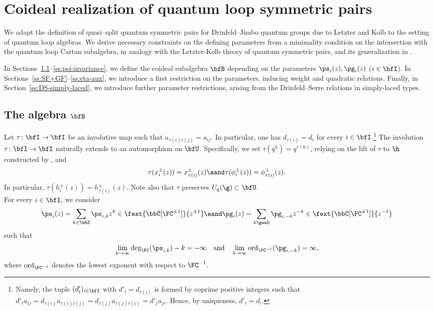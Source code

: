 \documentclass[reqno]{amsart}
\numberwithin{equation}{section}
\begin{document}
\section{Coideal realization of quantum loop symmetric pairs}\label{s:coideal-QLSP}

We adapt the definition of quasi--split quantum symmetric pairs for Drinfeld--Jimbo quantum groups due to Letzter and Kolb \cite{letzter-02,kolb-14} to the setting of quantum loop algebras. We derive necessary constraints on the defining parameters from a minimality condition on the intersection with the quantum loop Cartan subalgebra, in analogy with the Letzter-Kolb theory of quantum symmetric pairs, and its generalization in \cite{regelskis-vlaar-20, regelskis-vlaar-22}.

In Sections~\ref{ss:B-def}--\ref{ss:psi-invariance}, we define the coideal subalgebra 
$\bfB$ depending on the parameters $\ps_i(z),\pg_i(z)$ ($i\in\bfI$). 
In Sections~\ref{ss:SF+GF}--\ref{ss:eta-aux}, we introduce a first restriction on the 
parameters, inducing weight and quadratic relations.
Finally, in Section~\ref{ss:DS-simply-laced}, we introduce further parameter 
restrictions, arising from the Drinfeld--Serre relations in simply-laced types.

	\subsection{The algebra $\bfB$}\label{ss:B-def}
	Let $\tau\colon\bfI\to\bfI$ be an involutive map such that $a_{\tau(i)\tau(j)}=a_{ij}$. In particular, one has $d_{\tau(i)}=d_i$ for every $i\in\bfI$.\footnote{
	Namely, the tuple $(d'_i)_{i\in\bfI}$ with $d'_i=d_{\tau(i)}$ is formed by coprime positive integers such that $d'_ia_{ij}=d_{\tau(i)}a_{\tau(i)\tau(j)}=d_{\tau(j)}a_{\tau(j)\tau(i)}=d'_ja_{ji}$. Hence, by uniqueness, $d'_i=d_i$.}
	The involution $\tau\colon\bfI\to\bfI$ naturally extends to an automorphism on $\bfU$. Specifically, we set
	$\tau(q^h)=q^{\tau(h)}$, relying on the lift of $\tau$ to $\h$ constructed by \cite{kac-wang-92}, and
	\begin{equation}
		\tau(x^{\pm}_i(z))=x^{\pm}_{\tau(i)}(z)\aand \tau(\phi^{\pm}_i(z))=\phi^{\pm}_{\tau(i)}(z).
	\end{equation}
	In particular, $\tau(h^{\pm}_i(z))=h^{\pm}_{\tau(i)}(z)$. Note also that $\tau$ preserves
	$U_q(\g)\subset\bfU$.\\
	
	For every $i\in\bfI$, we consider
	\begin{equation}
		\ps_{i}(z)=\sum_{k\in\bbZ}\ps_{i,k}z^k\in\fext{\bbC[\FC^{\pm1}]}{z^{\pm1}}
		\aand
		\pg_{i}(z)=\sum_{k\ges0}\pg_{i,-k}z^{-k}\in\fext{\bbC[\FC^{\pm1}]}{z^{-1}}
	\end{equation}
such that 
\begin{equation}\label{eq:cond-sigma-gamma}
\lim_{k\to\infty}\operatorname{deg}_{\FC}(\ps_{i,k})-k=-\infty
\quad\mbox{and}\quad
\lim_{k\to\infty}\operatorname{ord}_{\FC^{-1}}(\pg_{i,-k})=\infty,
\end{equation}
where $\operatorname{ord}_{\FC^{-1}}$ denotes the lowest exponent with respect to $\FC^{-1}$.
\\
\end{document}
